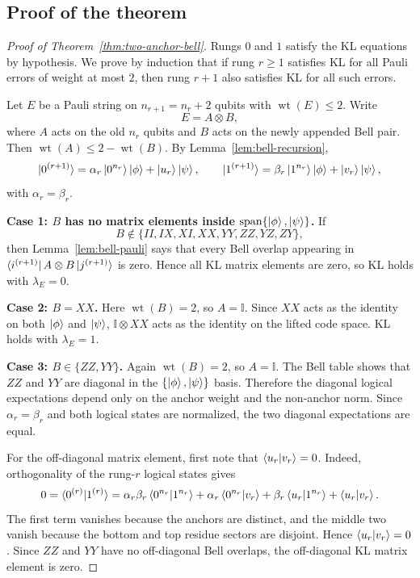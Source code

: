 \documentclass[11pt]{article}
\newcommand{\wt}{\operatorname{wt}}
\newcommand{\Span}{\operatorname{span}}
\newcommand{\id}{\mathbb I}
\newcommand{\ketphi}{\ket{\phi}}
\newcommand{\ketpsi}{\ket{\psi}}
\begin{document}
\subsection{Proof of the theorem}

\begin{proof}[Proof of Theorem~\ref{thm:two-anchor-bell}]
Rungs $0$ and $1$ satisfy the KL equations by hypothesis.  We prove by induction that if rung
$r\ge1$ satisfies KL for all Pauli errors of weight at most $2$, then rung $r+1$ also satisfies
KL for all such errors.

Let $E$ be a Pauli string on $n_{r+1}=n_r+2$ qubits with $\wt(E)\le2$.  Write
\begin{equation}
  E=A\otimes B,
  \label{eq:EAB}
\end{equation}
where $A$ acts on the old $n_r$ qubits and $B$ acts on the newly appended Bell pair.  Then
$\wt(A)\le2-\wt(B)$.  By Lemma~\ref{lem:bell-recursion},
\begin{equation}
  \ket{0^{(r+1)}}=\alpha_r\ket{0^{n_r}}\ketphi+\ket{u_r}\ketpsi,
  \qquad
  \ket{1^{(r+1)}}=\beta_r\ket{1^{n_r}}\ketphi+\ket{v_r}\ketpsi,
  \label{eq:proof-bell-recursion}
\end{equation}
with $\alpha_r=\beta_r$.

\medskip
\noindent\textbf{Case 1: $B$ has no matrix elements inside $\Span\{\ketphi,\ketpsi\}$.}
If
\[
  B\notin\{II,IX,XI,XX,YY,ZZ,YZ,ZY\},
\]
then Lemma~\ref{lem:bell-pauli} says that every Bell overlap appearing in
$\bra{i^{(r+1)}}A\otimes B\ket{j^{(r+1)}}$ is zero.  Hence all KL matrix elements are zero, so KL
holds with $\lambda_E=0$.

\medskip
\noindent\textbf{Case 2: $B=XX$.}
Here $\wt(B)=2$, so $A=\id$.  Since $XX$ acts as the identity on both $\ketphi$ and $\ketpsi$,
$\id\otimes XX$ acts as the identity on the lifted code space.  KL holds with $\lambda_E=1$.

\medskip
\noindent\textbf{Case 3: $B\in\{ZZ,YY\}$.}
Again $\wt(B)=2$, so $A=\id$.  The Bell table shows that $ZZ$ and $YY$ are diagonal in the
$\{\ketphi,\ketpsi\}$ basis.  Therefore the diagonal logical expectations depend only on the
anchor weight and the non-anchor norm.  Since $\alpha_r=\beta_r$ and both logical states are
normalized, the two diagonal expectations are equal.

For the off-diagonal matrix element, first note that $\braket{u_r|v_r}=0$.  Indeed,
orthogonality of the rung-$r$ logical states gives
\[
0=\braket{0^{(r)}|1^{(r)}}
=\alpha_r\beta_r\braket{0^{n_r}|1^{n_r}}
+\alpha_r\braket{0^{n_r}|v_r}
+\beta_r\braket{u_r|1^{n_r}}
+\braket{u_r|v_r}.
\]
The first term vanishes because the anchors are distinct, and the middle two vanish because the
bottom and top residue sectors are disjoint.  Hence $\braket{u_r|v_r}=0$.  Since $ZZ$ and $YY$
have no off-diagonal Bell overlaps, the off-diagonal KL matrix element is zero.


\end{proof}
\end{document}

